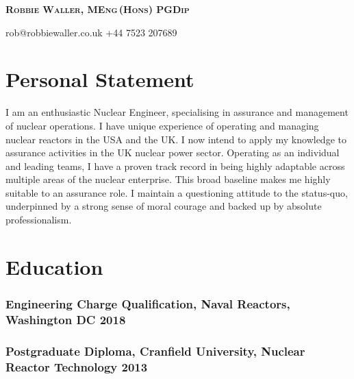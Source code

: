 \documentclass[a4paper, oneside, final, 11pt]{scrartcl} %
\begin{document}


{\fontsize{21}{21}\bfseries\scshape{Robbie Waller, MEng\,(Hons) PGDip}} %

\bigskip

\faEnvelopeO \space rob@robbiewaller.co.uk \hfill  \faMobile \space +44 7523 207689

\medskip

\section{Personal Statement}

I am an enthusiastic Nuclear Engineer, specialising in assurance and management of nuclear operations. I have unique experience of operating and managing nuclear reactors in the USA and the UK. I now intend to apply my knowledge to assurance activities in the UK nuclear power sector. Operating as an individual and leading teams, I have a proven track record in being highly adaptable across multiple areas of the nuclear enterprise. This broad baseline makes me highly suitable to an assurance role. I maintain a questioning attitude to the status-quo, underpinned by a strong sense of moral courage and backed up by absolute professionalism. 


\section{Education}

 \subsubsection*{Engineering Charge Qualification, Naval Reactors, Washington DC \hfill 2018} 
\subsubsection*{Postgraduate Diploma, Cranfield University, Nuclear Reactor Technology \hfill 2013}  
\end{document}
